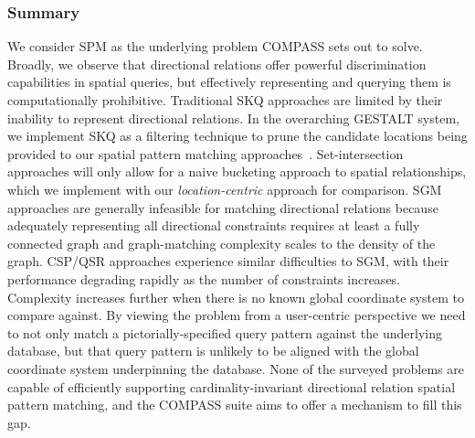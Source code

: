 \subsubsection{Summary}
\par{
    We consider SPM as the underlying problem COMPASS sets out to solve. 
    Broadly, we observe that directional relations offer powerful discrimination capabilities in spatial queries, but effectively representing and querying them is computationally prohibitive. 
    Traditional SKQ approaches are limited by their inability to represent directional relations. In the overarching GESTALT system, we implement SKQ as a filtering technique to prune the candidate locations being provided to our spatial pattern matching approaches~\cite{Osul2023}.
    Set-intersection approaches will only allow for a naive bucketing approach to spatial relationships, which we implement with our \textit{location-centric} approach for comparison.
    SGM approaches are generally infeasible for matching directional relations because adequately representing all directional constraints requires at least a fully connected graph and graph-matching complexity scales to the density of the graph.
    CSP/QSR approaches experience similar difficulties to SGM, with their performance degrading rapidly as the number of constraints increases.
    Complexity increases further when there is no known global coordinate system to compare against. 
    By viewing the problem from a user-centric perspective we need to not only match a pictorially-specified query pattern against the underlying database, but that query pattern is unlikely to be aligned with the global coordinate system underpinning the database. 
    None of the surveyed problems are capable of efficiently supporting cardinality-invariant directional relation spatial pattern matching, and the COMPASS suite aims to offer a mechanism to fill this gap. 
}

